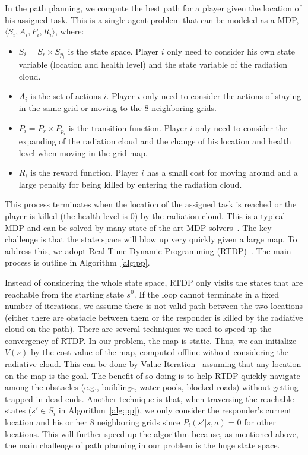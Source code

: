 In the path planning, we compute the best path for a player given
the location of his assigned task. This is a single-agent problem
that can be modeled as a MDP, $\langle S_i, A_i, P_i, R_i \rangle$,
where:
\begin{itemize}
  \item $S_i = S_r \times S_{p_i}$ is the state space. Player
      $i$ only need to consider his own state variable
      (location and health level) and the state variable of the
      radiation cloud.
  \item $A_i$ is the set of actions $i$. Player $i$ only need
      to consider the actions of staying in the same grid or
      moving to the 8 neighboring grids.
  \item $P_i = P_r \times P_{p_i}$ is the transition function.
      Player $i$ only need to consider the expanding of the
      radiation cloud and the change of his location and health
      level when moving in the grid map.
  \item $R_i$ is the reward function. Player $i$ has a small
      cost for moving around and a large penalty for being
      killed by entering the radiation cloud.
\end{itemize}
This process terminates when the location of the assigned task is
reached or the player is killed (the health level is 0) by the
radiation cloud. This is a typical MDP and can be solved by many
state-of-the-art MDP solvers~\cite{?}. The key challenge is that
the state space will blow up very quickly given a large map. To
address this, we adopt Real-Time Dynamic Programming
(RTDP)~\cite{?}. The main process is outline in
Algorithm~\ref{alg:pp}.

Instead of considering the whole state space, RTDP only visits the
states that are reachable from the starting state $s^0$. If the
loop cannot terminate in a fixed number of iterations, we assume
there is not valid path between the two locations (either there are
obstacle between them or the responder is killed by the radiative
cloud on the path). There are several techniques we used to speed
up the convergency of RTDP. In our problem, the map is static.
Thus, we can initialize $V(s)$ by the cost value of the map,
computed offline without considering the radiative cloud. This can
be done by Value Iteration~\cite{?} assuming that any location on
the map is the goal. The benefit of so doing is to help RTDP
quickly navigate among the obstacles (e.g., buildings, water pools,
blocked roads) without getting trapped in dead ends. Another
technique is that, when traversing the reachable states ($s'\in
S_i$ in Algorithm~\ref{alg:pp}), we only consider the responder's
current location and his or her 8 neighboring grids since
$P_i(s'|s,a) = 0$ for other locations. This will further speed up
the algorithm because, as mentioned above, the main challenge of
path planning in our problem is the huge state space.

